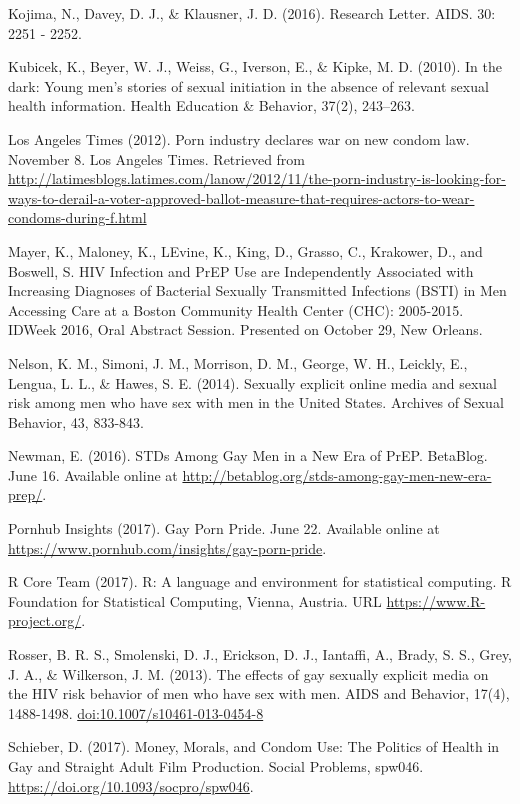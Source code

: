 \documentclass[]{article}
\begin{document}
Kojima, N., Davey, D. J., \& Klausner, J. D. (2016). Research Letter.
AIDS. 30: 2251 - 2252.

Kubicek, K., Beyer, W. J., Weiss, G., Iverson, E., \& Kipke, M. D.
(2010). In the dark: Young men's stories of sexual initiation in the
absence of relevant sexual health information. Health Education \&
Behavior, 37(2), 243--263.

Los Angeles Times (2012). Porn industry declares war on new condom law.
November 8. Los Angeles Times. Retrieved from
\url{http://latimesblogs.latimes.com/lanow/2012/11/the-porn-industry-is-looking-for-ways-to-derail-a-voter-approved-ballot-measure-that-requires-actors-to-wear-condoms-during-f.html}

Mayer, K., Maloney, K., LEvine, K., King, D., Grasso, C., Krakower, D.,
and Boswell, S. HIV Infection and PrEP Use are Independently Associated
with Increasing Diagnoses of Bacterial Sexually Transmitted Infections
(BSTI) in Men Accessing Care at a Boston Community Health Center (CHC):
2005-2015. IDWeek 2016, Oral Abstract Session. Presented on October 29,
New Orleans.

Nelson, K. M., Simoni, J. M., Morrison, D. M., George, W. H., Leickly,
E., Lengua, L. L., \& Hawes, S. E. (2014). Sexually explicit online
media and sexual risk among men who have sex with men in the United
States. Archives of Sexual Behavior, 43, 833-843.

Newman, E. (2016). STDs Among Gay Men in a New Era of PrEP. BetaBlog.
June 16. Available online at
\url{http://betablog.org/stds-among-gay-men-new-era-prep/}.

Pornhub Insights (2017). Gay Porn Pride. June 22. Available online at
\url{https://www.pornhub.com/insights/gay-porn-pride}.

R Core Team (2017). R: A language and environment for statistical
computing. R Foundation for Statistical Computing, Vienna, Austria. URL
\url{https://www.R-project.org/}.

Rosser, B. R. S., Smolenski, D. J., Erickson, D. J., Iantaffi, A.,
Brady, S. S., Grey, J. A., \& Wilkerson, J. M. (2013). The effects of
gay sexually explicit media on the HIV risk behavior of men who have sex
with men. AIDS and Behavior, 17(4), 1488-1498.
\url{doi:10.1007/s10461-013-0454-8}

Schieber, D. (2017). Money, Morals, and Condom Use: The Politics of
Health in Gay and Straight Adult Film Production. Social Problems,
spw046. \url{https://doi.org/10.1093/socpro/spw046}.
\end{document}
